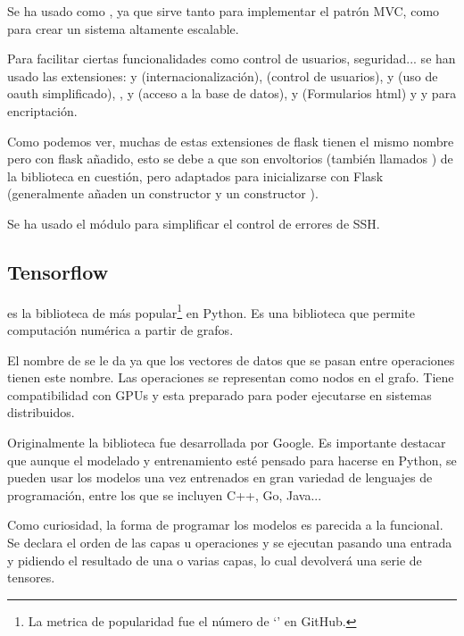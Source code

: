 Se ha usado  como , ya que sirve tanto para implementar el patrón MVC, como para crear un sistema altamente escalable. 

Para facilitar ciertas funcionalidades como control de usuarios, seguridad... se han usado las extensiones:  y  (internacionalización),  (control de usuarios),  y  (uso de oauth simplificado), ,  y  (acceso a la base de datos),  y  (Formularios html) y  y  para encriptación.

Como podemos ver, muchas de estas extensiones de flask tienen el mismo nombre pero con flask añadido, esto se debe a que son envoltorios (también llamados ) de la biblioteca en cuestión, pero adaptados para inicializarse con Flask (generalmente añaden un constructor y un constructor ).

Se ha usado el módulo  para simplificar el control de errores de SSH.

\subsection{Tensorflow}
 es la biblioteca de  más popular\footnote{La metrica de popularidad fue el número de `' en GitHub.} en Python. Es una biblioteca  que permite computación numérica a partir de grafos.

El nombre de  se le da ya que los vectores de datos que se pasan entre operaciones tienen este nombre. Las operaciones se representan como nodos en el grafo. Tiene compatibilidad con GPUs y esta preparado para poder ejecutarse en sistemas distribuidos. 

Originalmente la biblioteca fue desarrollada por Google. Es importante destacar que aunque el modelado y entrenamiento esté pensado para hacerse en Python, se pueden usar los modelos una vez entrenados en gran variedad de lenguajes de programación, entre los que se incluyen C++, Go, Java... 

Como curiosidad, la forma de programar los modelos es parecida a la funcional. Se declara el orden de las capas u operaciones y se ejecutan pasando una entrada y pidiendo el resultado de una o varias capas, lo cual devolverá una serie de tensores. 




 

